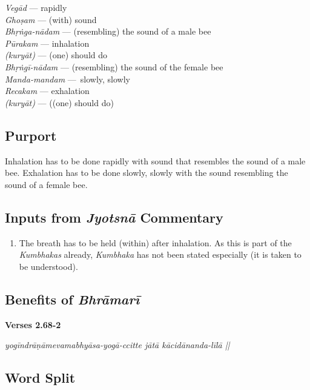 \begin{multicols}{2}
\textit{Vegād} --- rapidly\\
\textit{Ghoṣam} --- (with) sound \\
\textit{Bhṛṅga-nādam} --- (resembling) the sound of a male bee\\
\textit{Pūrakam} --- inhalation \\
\textit{(kuryāt)} --- (one) should do \\
\textit{Bhṛṅgī-nādam} --- (resembling) the sound of the female bee \\
\textit{Manda-mandam} --- slowly, slowly \\
\textit{Recakam} --- exhalation \\
\textit{(kuryāt)} --- ((one) should do)
\end{multicols}

\subsection*{Purport}

Inhalation has to be done rapidly with sound that resembles the sound of a male bee. Exhalation has to be done slowly, slowly with the sound resembling the sound of a female bee.

\subsection*{Inputs from \textit{Jyotsnā} Commentary}


\begin{enumerate}
\item The breath has to be held (within) after inhalation. As this is part of the \textit{Kumbhakas} already, \textit{Kumbhaka} has not been stated especially (it is taken to be understood). 
\end{enumerate}
\newpage
\subsection*{Benefits of \textit{Bhrāmarī}}


\noindent \textbf{Verses 2.68-2}

\begin{center}
\textit{yogīndrāṇāmevamabhyāsa-yogā-ccitte jātā kācidānanda-līlā ||}
\end{center}

\subsection*{Word Split}

